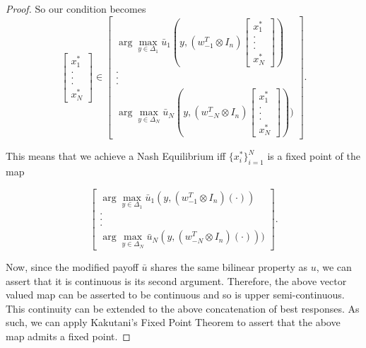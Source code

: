 \documentclass{article}
\theoremstyle{definition}
\begin{document}
\begin{proof}
		So our condition becomes
		\begin{equation}
			\begin{bmatrix}
				x_1^* \\ . \\ . \\ . \\ x_N^*
			\end{bmatrix} \in
			\begin{bmatrix}
				\arg\max_{y \in \Delta_1} \bar{u}_1(y, (w_{-1}^T \otimes I_n) \begin{bmatrix}
					x_1^* \\ . \\ . \\ . \\ x_N^*
				\end{bmatrix}) \\ . \\ . \\ . \\ \arg\max_{y \in \Delta_N} \bar{u}_N(y, (w_{-N}^T \otimes I_n) \begin{bmatrix}
				x_1^* \\ . \\ . \\ . \\ x_N^*
			\end{bmatrix}))
			\end{bmatrix}	.
		\end{equation}

		This means that we achieve a Nash Equilibrium iff $\{ x_i^*\}_{i = 1}^N$ is a fixed point of the map
	
	
		\begin{equation}
			\begin{bmatrix}
				\arg\max_{y \in \Delta_1} \bar{u}_1(y, (w_{-1}^T \otimes I_n) ( \cdot )) \\ . \\ . \\ . \\ \arg\max_{y \in \Delta_N} \bar{u}_N(y, (w_{-N}^T \otimes I_n)( \cdot )))
			\end{bmatrix}	.
		\end{equation}


		Now, since the modified payoff $\bar{u}$ shares the same bilinear property as $u$, we can assert that it is continuous is its second argument. Therefore, the above vector valued map can be asserted to be continuous and so is upper semi-continuous. This continuity can be extended to the above concatenation of best responses. As such, we can apply Kakutani's Fixed Point Theorem to assert that the above map admits a fixed point.

	\end{proof}
\end{document}
